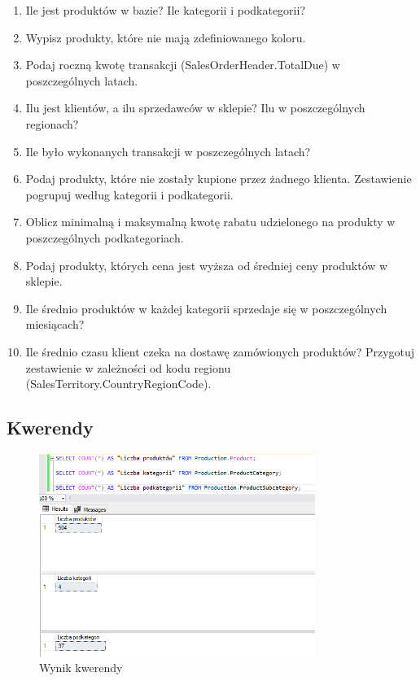 \documentclass[a4paper,12pt]{article}
\begin{document}
\begin{enumerate}
    \item Ile jest produktów w bazie? Ile kategorii i podkategorii?
    \item Wypisz produkty, które nie mają zdefiniowanego koloru.
    \item Podaj roczną kwotę transakcji (SalesOrderHeader.TotalDue) w poszczególnych latach.
    \item Ilu jest klientów, a ilu sprzedawców w sklepie? Ilu w poszczególnych regionach?
    \item Ile było wykonanych transakcji w poszczególnych latach?
    \item Podaj produkty, które nie zostały kupione przez żadnego klienta. Zestawienie pogrupuj według kategorii i podkategorii.
    \item Oblicz minimalną i maksymalną kwotę rabatu udzielonego na produkty w poszczególnych podkategoriach.
    \item Podaj produkty, których cena jest wyższa od średniej ceny produktów w sklepie.
    \item Ile średnio produktów w każdej kategorii sprzedaje się w poszczególnych miesiącach?
    \item Ile średnio czasu klient czeka na dostawę zamówionych produktów? Przygotuj zestawienie w zależności od kodu regionu (SalesTerritory.CountryRegionCode).
\end{enumerate}

\subsection{Kwerendy}

\begin{figure}[H]
    \centering
    \includegraphics[width=0.8\textwidth]{images/01.png}
    \caption{Wynik kwerendy}
    \end{figure}
\end{document}
